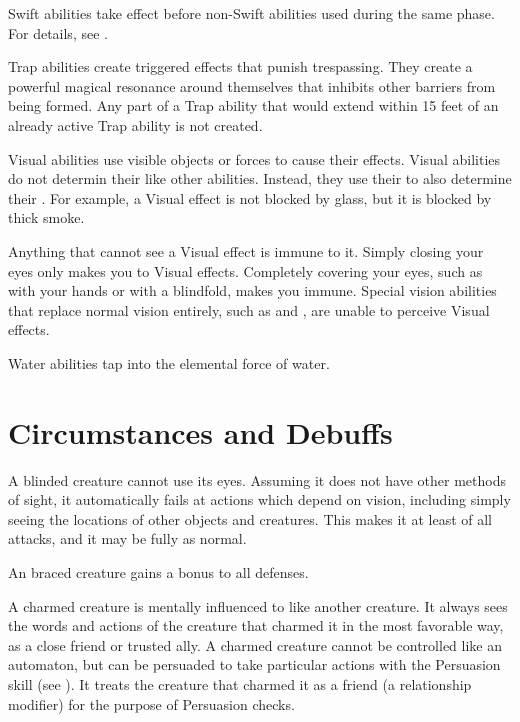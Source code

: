    Swift abilities take effect before non-Swift abilities used during the same phase.
  For details, see .

   Trap abilities create triggered effects that punish trespassing.
  They create a powerful magical resonance around themselves that inhibits other barriers from being formed.
  Any part of a Trap ability that would extend within 15 feet of an already active Trap ability is not created.

   Visual abilities use visible objects or forces to cause their effects.
  Visual abilities do not determin their  like other abilities.
  Instead, they use their  to also determine their .
  For example, a Visual effect is not blocked by glass, but it is blocked by thick smoke.

  Anything that cannot see a Visual effect is immune to it.
  Simply closing your eyes only makes you \impervious to Visual effects.
  Completely covering your eyes, such as with your hands or with a blindfold, makes you immune.
  Special vision abilities that replace normal vision entirely, such as  and , are unable to perceive Visual effects.

   Water abilities tap into the elemental force of water.

  \newpage
\section{Circumstances and Debuffs}\label{Circumstances and Debuffs}

   A blinded creature cannot use its eyes.
  Assuming it does not have other methods of sight, it automatically fails at actions which depend on vision, including simply seeing the locations of other objects and creatures.
  This makes it at least \partiallyunaware of all attacks, and it may be fully \unaware as normal.

   An braced creature gains a  bonus to all defenses.

   A charmed creature is mentally influenced to like another creature.
  It always sees the words and actions of the creature that charmed it in the most favorable way, as a close friend or trusted ally.
  A charmed creature cannot be controlled like an automaton, but can be persuaded to take particular actions with the Persuasion skill (see ).
  It treats the creature that charmed it as a friend (a  relationship modifier) for the purpose of Persuasion checks.

